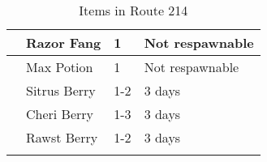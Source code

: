 \begin{longtable}{|| l l l l ||}%
\hline%
&Razor Fang&1&Not respawnable\\%
\hline%
&Max Potion&1&Not respawnable\\%
\hline%
&Sitrus Berry&1{-}2&3 days\\%
\hline%
&Cheri Berry&1{-}3&3 days\\%
\hline%
&Rawst Berry&1{-}2&3 days\\%
\hline%
\endhead%
\hline%
\caption{Items in Route 214}%
\label{tab:Route214Items}%
\end{longtable}